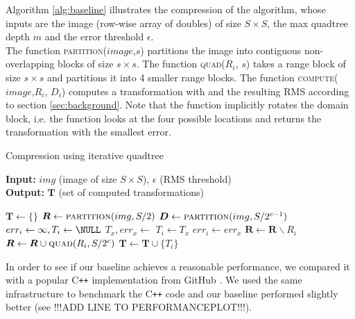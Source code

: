 Algorithm \ref{alg:baseline} illustrates the compression of the algorithm, whose inputs are the image (row-wise array of doubles) of size $S \times S$,
the max quadtree depth $m$ and the error threshold $\epsilon$.\\
The function \textsc{partition($image$,$s$)} partitions the image into contiguous non-overlapping blocks of size $s \times s$.
The function \textsc{quad($R_i$, $s$)} takes a range block of size $s \times s$ and partitions it into 4 smaller range blocks.
The function \textsc{compute($image$,$R_i$, $D_i$)} computes a transformation with and the resulting RMS according to section \ref{sec:background}. 
Note that the function implicitly rotates the domain block, i.e. the function looks at the four possible locations and returns the transformation with the smallest error.
\begin{algorithm}
\caption{Compression using iterative quadtree}\label{alg:baseline}
\hspace*{\algorithmicindent} \textbf{Input:} $img$ (image of size $S \times S$), $\epsilon$ (RMS threshold) \\
\hspace*{\algorithmicindent} \textbf{Output:} $\boldsymbol{T}$ (set of computed transformations)
\begin{algorithmic}[1]
  \State $\boldsymbol{T} \gets \{\}$  
  \State $\boldsymbol{R} \gets \Call{partition}{img, S/2}$  
     
        \State $\boldsymbol{D} \gets \Call{partition}{img, S/2^{c-1}}$
            \State $err_i \gets \infty, T_i \gets \NULL$
              \State $T_x, err_x \gets $ 
                \State $T_i \gets T_x$
                \State $err_i \gets err_x$
              \EndIf
            \EndFor
        \EndFor
        \State $\boldsymbol{R} \gets \boldsymbol{R} \backslash  R_i$ 
          \State $\boldsymbol{R} \gets \boldsymbol{R} \cup  \Call{quad}{R_i, S/2^c}$
        \Else
          \State $\boldsymbol{T} \gets \boldsymbol{T} \cup \{T_i\}$
        \EndIf
    \EndFor
\end{algorithmic}
\end{algorithm}

In order to see if our baseline achieves a reasonable performance, we compared it with
a popular C\texttt{++} implementation from GitHub \cite{github-cpp}. We used the same infrastructure to benchmark
the C\texttt{++} code and our baseline performed slightly better (see !!!ADD LINE TO PERFORMANCEPLOT!!!).

